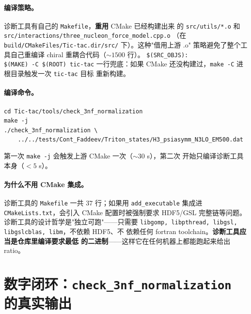 \begin{lstlisting}[caption={\texttt{Makefile} —— 与 CMake 共栈的轻量编译 (lines 1--37)}, label={lst:ch17-makefile}]
\end{lstlisting}


\paragraph{编译策略。}
诊断工具有自己的 \texttt{Makefile}，\textbf{重用} CMake 已经构建出来
的 \texttt{src/utils/*.o} 和 \texttt{src/interactions/three\_nucleon\_force\_model.cpp.o}
（在 \texttt{build/CMakeFiles/Tic-tac.dir/src/} 下）。这种"借用上游 .o"
策略避免了整个工具自己重编译 chiral 重耦合代码（\(\sim 1500\) 行）。
\texttt{\$(SRC\_OBJS): \\ \$(MAKE) -C \$(ROOT) tic-tac} 一行兜底：如果 CMake
还没构建过，\texttt{make -C} 进根目录触发一次 \texttt{tic-tac} 目标
重新构建。

\paragraph{编译命令。}
\begin{verbatim}
cd Tic-tac/tools/check_3nf_normalization
make -j
./check_3nf_normalization \
    ../../tests/Cont_Faddeev/Triton_states/H3_psiasymm_N3LO_EM500.dat
\end{verbatim}

第一次 \texttt{make -j} 会触发上游 CMake 一次（\(\sim 30\) s），第二次
开始只编译诊断工具本身（\(<5\) s）。

\paragraph{为什么不用 CMake 集成。}
诊断工具的 \texttt{Makefile} 一共 \(37\) 行；如果用 \texttt{add\_executable}
集成进 \texttt{CMakeLists.txt}，会引入 CMake 配置时被强制要求
HDF5/GSL 完整链等问题。诊断工具的设计哲学是"独立可跑"——只需要
\texttt{libgomp, libpthread, libgsl, libgslcblas, libm}，不依赖 HDF5、不
依赖任何 fortran toolchain。\textbf{诊断工具应当是仓库里编译要求最低
的二进制}——这样它在任何机器上都能跑起来给出 ratio。

\section{数字闭环：\texttt{check\_3nf\_normalization} 的真实输出}
\label{sec:ch17-numerical-loop}

